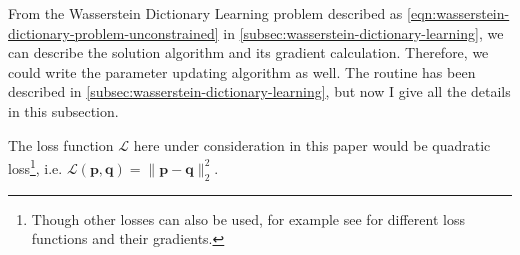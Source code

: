 
From the Wasserstein Dictionary Learning problem described as \cref{eqn:wasserstein-dictionary-problem-unconstrained}
in \cref{subsec:wasserstein-dictionary-learning},
we can describe the solution algorithm and its gradient calculation.
Therefore, we could write the parameter updating algorithm as well.
The routine has been described in \cref{subsec:wasserstein-dictionary-learning},
but now I give all the details in this subsection.

The loss function $\mathcal{L}$ here under consideration in this paper would be quadratic loss\footnote{
  Though other losses can also be used,
  for example see \citet[Table 1]{schmitz2018} for different loss functions and their gradients.
},
i.e. $\mathcal{L}(\mathbf{p}, \mathbf{q}) = \lVert \mathbf{p} - \mathbf{q}\rVert_2^2.$
